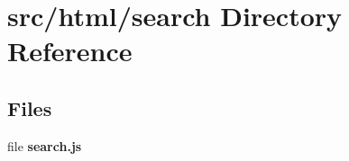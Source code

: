 \section{src/html/search Directory Reference}
\label{dir_f1562bae50fc06386765ccb3354f31af}
\subsection*{Files}
\begin{DoxyCompactItemize}
\item 
file {\bf search.\-js}
\end{DoxyCompactItemize}
